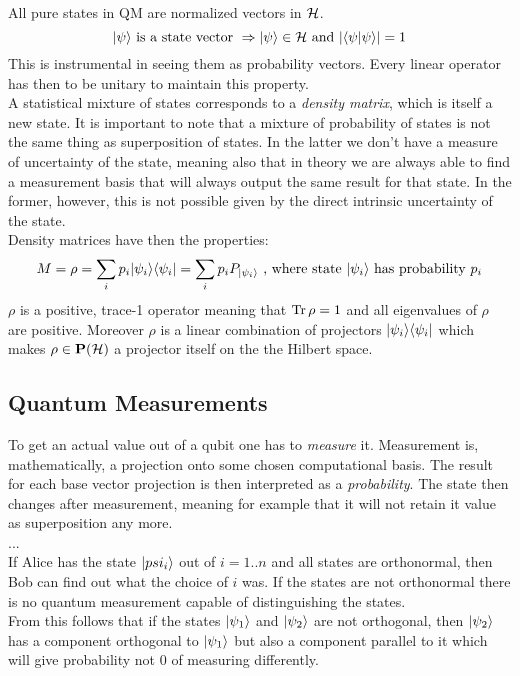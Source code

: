 	All pure states in QM are normalized vectors in $\mathcal{H}$.
	$$ |\psi \rangle \text{ is a state vector } \Rightarrow |\psi \rangle\in\mathcal{H} \text{ and }  \vert\langle\psi|\psi\rangle\vert = 1$$
	This is instrumental in seeing them as probability vectors. Every linear operator has then to be unitary to maintain this property.\\
	A statistical mixture of states corresponds to a \emph{density matrix}, which is itself a new state. It is important to note that a mixture of probability of states is not the same thing as superposition of states. In the latter we don't have a measure of uncertainty of the state, meaning also that in theory we are always able to find a measurement basis that will always output the same result for that state. In the former, however, this is not possible given by the direct intrinsic uncertainty of the state.\\
	Density matrices have then the properties:
	$$ M = \rho = \sum_i p_i |\psi_i \rangle\langle \psi_i| = \sum_i p_i P_{|\psi_i \rangle} \text{  , where state }|\psi_i \rangle\text{ has probability } p_i $$ 
	$\rho$ is a positive, trace-1 operator meaning that $\operatorname{Tr}{\rho} = 1$ and all eigenvalues of $\rho$ are positive. Moreover $\rho$ is a linear combination of projectors $|\psi_i\rangle\langle \psi_i|$ which makes $\rho\in\mathbf{P}(\mathcal{H})$ a projector itself on the the Hilbert space.
	
		\subsection{Quantum Measurements}
		To get an actual value out of a qubit one has to \textit{measure} it. Measurement is, mathematically, a projection onto some chosen computational basis. The result for each base vector projection is then interpreted as a \emph{probability}. The state then changes after measurement, meaning for example that it will not retain it value as superposition any more.\\
		...\\
		
		If Alice has the state $|psi_i \rangle$ out of $i=1..n$ and all states are orthonormal, then Bob can find out what the choice of $i$ was.
		If the states are not orthonormal there is no quantum measurement capable of distinguishing the states. \\
		From this follows that if the states $|\psi_1 \rangle$ and $|\psi_2 \rangle$ are not orthogonal, then $|\psi_2 \rangle$ has a component orthogonal to $|\psi_1 \rangle$ but also a component parallel to it which will give probability not $0$ of measuring differently.
		
